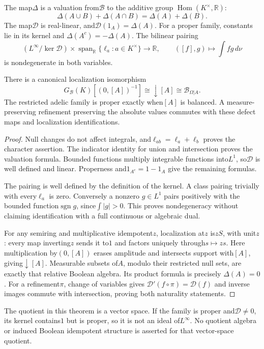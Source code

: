 \begin{theorem}\label{thm:measured-defect}
The map$\Delta$ is a valuation from$\mathscr B$ to the additive group
$\operatorname{Hom}(K^\times,\mathbb R)$:
\[
 \Delta(A\cup B)+\Delta(A\cap B)=\Delta(A)+\Delta(B).
\]
The map$\mathcal D$ is real-linear, and$\mathcal D(1_A)=\Delta(A)$.
For a proper family, constants lie in its kernel and
$\Delta(A^c)=-\Delta(A)$. The bilinear pairing
\[
 \left(L^\infty/\ker\mathcal D\right)
 \times\operatorname{span}_{\mathbb R}\{\ell_a:a\in K^\times\}
 \longrightarrow\mathbb R,
 \qquad([f],g)\longmapsto\int fg\,d\nu
\]
is nondegenerate in both variables.

There is a canonical localization isomorphism
\[
 G_{\mathscr B}(K)[(0,[A])^{-1}]
 \cong\downarrow[A]\cong\mathscr B_{\Omega|A}.
\]
The restricted adelic family is proper exactly when$[A]$ is balanced.
A measure-preserving refinement preserving the absolute values commutes
with these defect maps and localization identifications.
\end{theorem}
\begin{proof}
Null changes do not affect integrals, and$\ell_{ab}=\ell_a+\ell_b$ proves
the character assertion. The indicator identity for union and intersection
proves the valuation formula. Bounded functions multiply integrable
functions into$L^1$, so$\mathcal D$ is well defined and linear. Properness
and$1_{A^c}=1-1_A$ give the remaining formulas.

The pairing is well defined by the definition of the kernel. A class
pairing trivially with every$\ell_a$ is zero. Conversely a nonzero
$g\in L^1$ pairs positively with the bounded function$\operatorname{sgn}g$,
since$\int|g|>0$. This proves nondegeneracy without claiming identification
with a full continuous or algebraic dual.

For any semiring and multiplicative idempotent$z$, localization at$z$
is$zS$, with unit$z$: every map inverting$z$ sends it to$1$ and factors
uniquely through$s\mapsto zs$. Here multiplication by$(0,[A])$ erases
amplitude and intersects support with$[A]$, giving$\downarrow[A]$.
Measurable subsets of$A$, modulo their restricted null sets, are exactly
that relative Boolean algebra. Its product formula is precisely
$\Delta(A)=0$. For a refinement$\pi$, change of variables gives
$\mathcal D'(f\circ\pi)=\mathcal D(f)$ and inverse images commute with
intersection, proving both naturality statements.
\end{proof}

The quotient in this theorem is a vector space. If the family is proper
and$\mathcal D\ne0$, its kernel contains$1$ but is proper, so it is not an
ideal of$L^\infty$. No quotient algebra or induced Boolean idempotent
structure is asserted for that vector-space quotient.

